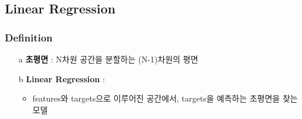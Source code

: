 \documentclass{article}
\begin{document}
\subsection{Linear Regression}

\subsubsection{Definition}
\begin{itemize}
    \item[a] \textbf{초평면} : N차원 공간을 분할하는 (N-1)차원의 평면  
    \item[b] \textbf{Linear Regression} : 
        \begin{itemize}
            \item features와 targets으로 이루어진 공간에서, targets을 예측하는 초평면을 찾는 모델
        \end{itemize}
\end{itemize}
\end{document}
